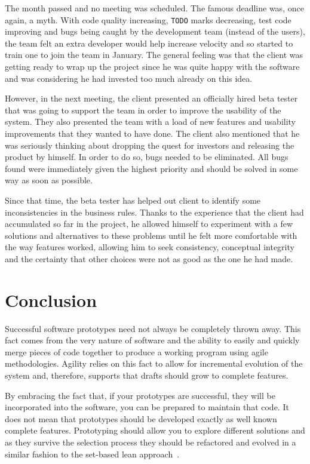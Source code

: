 \documentclass[lnbip]{svmultln}
\begin{document}
The month passed and no meeting was scheduled. The famous deadline
was, once again, a myth. With code quality increasing, \texttt{TODO}
marks decreasing, test code improving and bugs being caught by the
development team (instead of the users), the team felt an extra
developer would help increase velocity and so started to train one to
join the team in January. The general feeling
was that the client was getting ready to wrap up the project since he
was quite happy with the software and was considering he had invested too
much already on this idea.

However, in the next meeting, the client presented an officially hired
beta tester that was going to support the team in order to improve the
usability of the system. They also presented the team with a load of
new features and usability improvements that they wanted to have
done. The client also mentioned that he was seriously thinking about
dropping the quest for investors and releasing the product by
himself. In order to do so, bugs needed to be eliminated. All bugs
found were immediately given the highest priority and should be solved in
some way as soon as possible.

Since that time, the beta tester has helped out client to identify
some inconsistencies in the business rules. Thanks to
the experience that the client had accumulated so far in the project,
he allowed himself to experiment with a few solutions and alternatives
to these problems until he felt
more comfortable with the way features worked, allowing him to seek
consistency, conceptual integrity and the certainty that other choices
were not as good as the one he had made.

\section{Conclusion}
\label{sec:conclusion}

Successful software prototypes need not always be completely thrown
away. This fact comes from the very nature of software and the ability
to easily and quickly merge pieces of code together to produce a
working program using agile methodologies. Agility relies on this
fact to allow for incremental
evolution of the system and, therefore, supports that drafts should
grow to complete features.

By embracing the fact that, if your prototypes are successful, they will be
incorporated into the software, you can be prepared to maintain that
code. It does not mean that prototypes should be developed exactly
as well known complete features. Prototyping should allow you to
explore different solutions and as they survive
the selection process they should be refactored and evolved in a similar fashion to the set-based lean approach~\cite{Poppendieck2009}.
\end{document}
